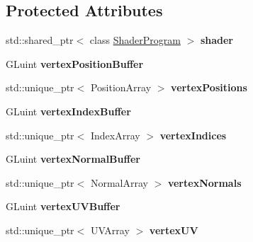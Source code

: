 \subsection*{Protected Attributes}
\begin{DoxyCompactItemize}
\item 
\hypertarget{class_rendering_object_ae50e545ce2008ffa802478cd4316e82e}{}std\+::shared\+\_\+ptr$<$ class \hyperlink{class_shader_program}{Shader\+Program} $>$ {\bfseries shader}\label{class_rendering_object_ae50e545ce2008ffa802478cd4316e82e}

\item 
\hypertarget{class_rendering_object_a473f623b39157288bef992e76ddc45a9}{}G\+Luint {\bfseries vertex\+Position\+Buffer}\label{class_rendering_object_a473f623b39157288bef992e76ddc45a9}

\item 
\hypertarget{class_rendering_object_a14721712672d0421ed72a394e3131da0}{}std\+::unique\+\_\+ptr$<$ Position\+Array $>$ {\bfseries vertex\+Positions}\label{class_rendering_object_a14721712672d0421ed72a394e3131da0}

\item 
\hypertarget{class_rendering_object_a6740a0a0e6bd4d841c9c211f2a31cca3}{}G\+Luint {\bfseries vertex\+Index\+Buffer}\label{class_rendering_object_a6740a0a0e6bd4d841c9c211f2a31cca3}

\item 
\hypertarget{class_rendering_object_a7b84487d3c34c1ca36b2ac6060b0f802}{}std\+::unique\+\_\+ptr$<$ Index\+Array $>$ {\bfseries vertex\+Indices}\label{class_rendering_object_a7b84487d3c34c1ca36b2ac6060b0f802}

\item 
\hypertarget{class_rendering_object_a91649e3a653f2266cd00c718f10849f9}{}G\+Luint {\bfseries vertex\+Normal\+Buffer}\label{class_rendering_object_a91649e3a653f2266cd00c718f10849f9}

\item 
\hypertarget{class_rendering_object_ac28d301f97d29ab603f65f8e823063b4}{}std\+::unique\+\_\+ptr$<$ Normal\+Array $>$ {\bfseries vertex\+Normals}\label{class_rendering_object_ac28d301f97d29ab603f65f8e823063b4}

\item 
\hypertarget{class_rendering_object_ad583c70014e3f6ab0c9b62ea3c96ad25}{}G\+Luint {\bfseries vertex\+U\+V\+Buffer}\label{class_rendering_object_ad583c70014e3f6ab0c9b62ea3c96ad25}

\item 
\hypertarget{class_rendering_object_afc405316bddec4ba1d5c228ecc0d9061}{}std\+::unique\+\_\+ptr$<$ U\+V\+Array $>$ {\bfseries vertex\+U\+V}\label{class_rendering_object_afc405316bddec4ba1d5c228ecc0d9061}


\end{DoxyCompactItemize}
